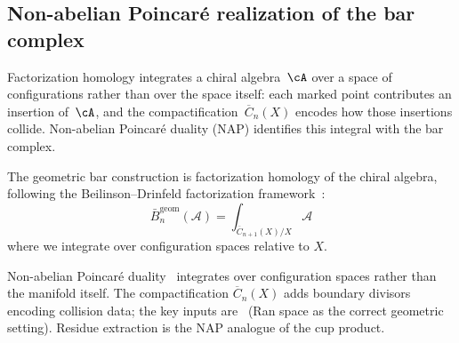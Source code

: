 \subsection{Non-abelian Poincar\'e realization of the bar complex}

Factorization homology integrates a chiral algebra~$\cA$ over a space of configurations rather than over the space itself: each marked point contributes an insertion of~$\cA$, and the compactification~$\overline{C}_n(X)$ encodes how those insertions collide. Non-abelian Poincar\'e duality (NAP) identifies this integral with the bar complex.

\begin{definition}\label{def:bar-fh}
The geometric bar construction is factorization homology of the
chiral algebra, following the Beilinson--Drinfeld factorization
framework~\cite[\S3.4]{BD04}:
\[\bar{B}^{\text{geom}}_n(\mathcal{A}) = \int_{\overline{C}_{n+1}(X)/X} \mathcal{A}\]
where we integrate over configuration spaces relative to $X$.
\end{definition}

\begin{remark}\label{rem:why-config-NAP}
Non-abelian Poincar\'e duality~\cite[\S3.4]{BD04} integrates
over configuration spaces rather than the manifold itself. The
compactification $\overline{C}_n(X)$ adds boundary divisors encoding
collision data; the key inputs are~\cite[Theorem~3.4.22, \S3.6]{BD04}
(Ran space as the correct geometric setting). Residue extraction is
the NAP analogue of the cup product.
\end{remark}

